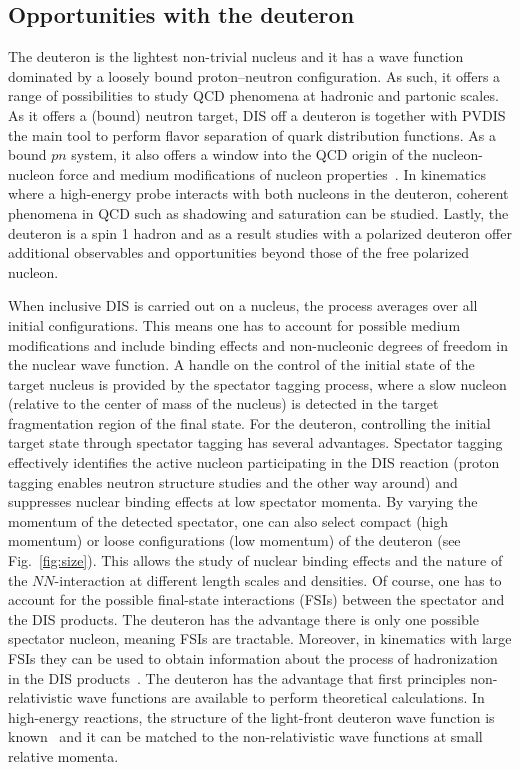 \subsection{Opportunities with the deuteron}

The deuteron is the lightest non-trivial nucleus and it has a wave function dominated by a loosely bound proton--neutron configuration.  As such, it offers a range of possibilities to study QCD phenomena at hadronic and partonic scales.  As it offers a (bound) neutron target, DIS off a deuteron is together with PVDIS the main tool to perform flavor separation of quark distribution functions.  As a bound $pn$ system, it also offers a window into the QCD origin of the nucleon-nucleon force and medium modifications of nucleon properties~\cite{Boeglin:2015cha}.  In kinematics where a high-energy probe interacts with both nucleons in the deuteron, coherent phenomena in QCD such as shadowing and saturation can be studied.  Lastly, the deuteron is a spin 1 hadron and as a result studies with a polarized deuteron offer additional observables and opportunities beyond those of the free polarized nucleon.

When inclusive DIS is carried out on a nucleus, the process averages over all initial configurations.  This means one has to account for possible medium modifications and include binding effects and non-nucleonic degrees of freedom in the nuclear wave function.  A handle on the control of the initial state of the target nucleus is provided by the spectator tagging process, where a slow nucleon (relative to the center of mass of the nucleus) is detected in the target fragmentation region of the final state.  For the deuteron, controlling the initial target state through spectator tagging has several advantages.  Spectator tagging effectively identifies the active nucleon participating in the DIS reaction (proton tagging enables neutron structure studies and the other way around) and suppresses nuclear binding effects at low spectator momenta.  By varying the momentum of the detected spectator, one can also select compact (high momentum) or loose configurations (low momentum) of the deuteron (see Fig.~\ref{fig:size}).  This allows the study of nuclear binding effects and the nature of the $NN$-interaction at different length scales and densities.  Of course, one has to account for the possible final-state interactions (FSIs) between the spectator and the DIS products.  The deuteron has the advantage there is only one possible spectator nucleon, meaning FSIs are tractable.  Moreover, in kinematics with large FSIs they can be used to obtain information about the process of hadronization in the DIS products~\cite{Cosyn:2017ekf}.  The deuteron has the advantage that first principles non-relativistic wave functions are available to perform theoretical calculations.  In high-energy reactions, the structure of the light-front deuteron wave function is known~\cite{Frankfurt:1981mk,Keister:1991sb} and it can be matched to the non-relativistic wave functions at small relative momenta.

